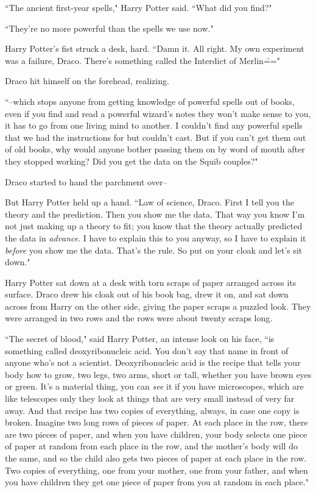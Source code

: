 ``The ancient first-year spells," Harry Potter said. ``What did you find?"

``They're no more powerful than the spells we use now."

Harry Potter's fist struck a desk, hard. ``Damn it. All right. My own experiment was a failure, Draco. There's something called the Interdict of Merlin\==="

Draco hit himself on the forehead, realizing.

``\---which stops anyone from getting knowledge of powerful spells out of books, even if you find and read a powerful wizard's notes they won't make sense to you, it has to go from one living mind to another. I couldn't find any powerful spells that we had the instructions for but couldn't cast. But if you can't get them out of old books, why would anyone bother passing them on by word of mouth after they stopped working? Did you get the data on the Squib couples?"

Draco started to hand the parchment over\---

But Harry Potter held up a hand. ``Law of science, Draco. First I tell you the theory and the prediction. Then you show me the data. That way you know I'm not just making up a theory to fit; you know that the theory actually predicted the data in \emph{advance}. I have to explain this to you anyway, so I have to explain it \emph{before} you show me the data. That's the rule. So put on your cloak and let's sit down."

Harry Potter sat down at a desk with torn scraps of paper arranged across its surface. Draco drew his cloak out of his book bag, drew it on, and sat down across from Harry on the other side, giving the paper scraps a puzzled look. They were arranged in two rows and the rows were about twenty scraps long.

``The secret of blood," said Harry Potter, an intense look on his face, ``is something called deoxyribonucleic acid. You don't say that name in front of anyone who's not a scientist. Deoxyribonucleic acid is the recipe that tells your body how to grow, two legs, two arms, short or tall, whether you have brown eyes or green. It's a material thing, you can \emph{see} it if you have microscopes, which are like telescopes only they look at things that are very small instead of very far away. And that recipe has two copies of everything, always, in case one copy is broken. Imagine two long rows of pieces of paper. At each place in the row, there are two pieces of paper, and when you have children, your body selects one piece of paper at random from each place in the row, and the mother's body will do the same, and so the child also gets two pieces of paper at each place in the row. Two copies of everything, one from your mother, one from your father, and when you have children they get one piece of paper from you at random in each place."

